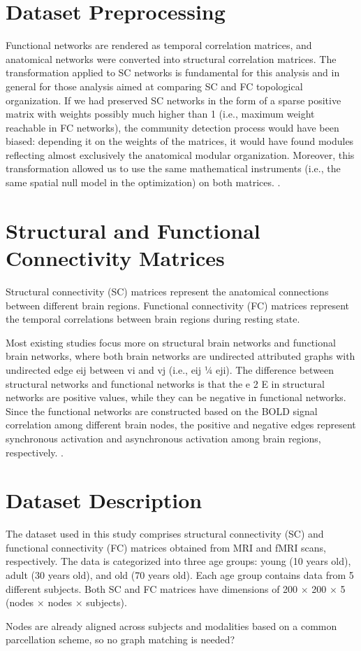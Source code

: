 
\section{Dataset Preprocessing}
Functional networks are rendered as temporal correlation matrices, and anatomical networks were converted into structural 
correlation matrices.
The transformation applied to SC networks is fundamental for this analysis and in general for those analysis aimed at 
comparing SC and FC topological organization. 
If we had preserved SC networks in the form of a sparse positive matrix with
weights possibly much higher than 1 (i.e., maximum weight reachable in FC networks), the community detection process would  
have been biased: depending it on the weights of the matrices, it would have found modules reflecting almost exclusively 
the anatomical modular organization.
Moreover, this transformation allowed us to use the same mathematical instruments (i.e., the same spatial null model in 
the optimization) on both matrices.
\cite{Puxeddu2022}.

\section{Structural and Functional Connectivity Matrices}
Structural connectivity (SC) matrices represent the anatomical connections between different brain regions.
Functional connectivity (FC) matrices represent the temporal correlations between brain regions during resting state.

Most existing studies focus more on structural brain networks 
and functional brain networks, where both brain networks are 
undirected attributed graphs with undirected edge eij between 
vi and vj (i.e., eij ¼ eji). The difference between structural
networks and functional networks is that the e 2 E in structural 
networks are positive values, while they can be negative in 
functional networks.
Since the functional networks are constructed based on the BOLD 
signal correlation among different brain nodes, the positive and 
negative edges represent synchronous activation and asynchronous 
activation among brain regions, respectively. \cite{Tang2023}.


\section{Dataset Description}
The dataset used in this study comprises structural connectivity (SC) and functional connectivity (FC) matrices 
obtained from MRI and fMRI scans, respectively. The data is categorized into three age groups: 
young (10 years old), adult (30 years old), and old (70 years old). Each age group contains data from 5 different subjects.
Both SC and FC matrices have dimensions of 200 $\times$ 200 $\times$ 5 (nodes $\times$ nodes $\times$ subjects).

Nodes are already aligned across subjects and modalities based on a 
common parcellation scheme, so no graph matching is needed? \cite{Puxeddu2022}
